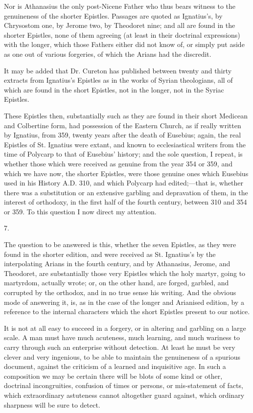 Nor is Athanasius the only
post-Nicene Father who thus bears witness to the genuineness of the
shorter Epistles. Passages are quoted as Ignatius's, by Chrysostom
one, by Jerome two, by Theodoret nine; and all are found in the
shorter Epistles, none of them agreeing (at least in their doctrinal
expressions) with the longer, which those Fathers either did not know
of, or simply put aside as one out of various forgeries, of which the
Arians had the discredit.

It may be added that Dr.
Cureton has published between twenty and thirty extracts from Ignatius's
Epistles as in the works of Syrian theologians, all of which are found
in the short Epistles, not in the longer, not in the Syriac Epistles.

These Epistles then,
substantially such as they are found in their short Medicean and
Colbertine form, had possession of the Eastern Church, as if really
written by Ignatius, from 359, twenty years after the death of
Eusebius; again, the real Epistles of St. Ignatius were extant, and
known to ecclesiastical writers from the time of Polycarp to that of
Eusebius' history; and the sole question, I repeat, is whether those
which were received as genuine from the year 354 or 359, and which we
have now, the shorter Epistles, were those genuine ones which Eusebius
used in his History A.D.
310, and which Polycarp had edited;—that is, whether there was a
substitution or an extensive garbling and depravation of them,
in the interest of orthodoxy, in the first half of the fourth century,
between 310 and 354 or 359. To this question I now direct my
attention.

7.

The question to be answered is
this, whether the seven Epistles, as they were found in the shorter
edition, and were received as St. Ignatius's by the interpolating
Arians in the fourth century, and by Athanasius, Jerome, and Theodoret,
are substantially those very Epistles which the holy martyr, going to
martyrdom, actually wrote; or, on the other hand, are forged, garbled,
and corrupted by the orthodox, and in no true sense his writing. And
the obvious mode of answering it, is, as in the case of the longer and
Arianised edition, by a reference to the internal characters which the
short Epistles present to our notice.

It is not at all easy to
succeed in a forgery, or in altering and garbling on a large scale. A
man must have much acuteness, much learning, and much wariness to
carry through such an enterprise without detection. At least he must
be very clever and very ingenious, to be able to maintain the
genuineness of a spurious document, against the criticism of a learned
and inquisitive age. In such a composition we may be certain there
will be blots of some kind or other, doctrinal incongruities,
confusion of times or persons, or mis-statement of facts, which
extraordinary astuteness cannot altogether guard against, which
ordinary sharpness will be sure to detect.

